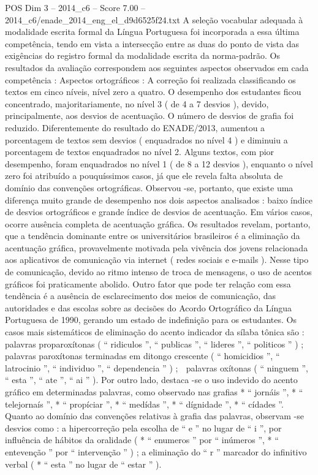 \begin{textsample}{POS Dim 3 – 2014\_c6 – Score 7.00 – 2014\_c6/enade\_2014\_eng\_el\_d9d6525f24.txt}
A seleção vocabular adequada à modalidade escrita formal da Língua Portuguesa foi incorporada a essa última competência, tendo em vista a intersecção entre as duas do ponto de vista das exigências do registro formal da modalidade escrita da norma-padrão.
Os resultados da avaliação correspondem aos seguintes aspectos observados em cada competência : Aspectos ortográficos : A correção foi realizada classificando os textos em cinco níveis, nível zero a quatro.
O desempenho dos estudantes ficou concentrado, majoritariamente, no nível 3 ( de 4 a 7 desvios ), devido, principalmente, aos desvios de acentuação.
O número de desvios de grafia foi reduzido.
Diferentemente do resultado do ENADE/2013, aumentou a porcentagem de textos sem desvios ( enquadrados no nível 4 ) e diminuiu a porcentagem de textos enquadrados no nível 2.
Alguns textos, com pior desempenho, foram enquadrados no nível 1 ( de 8 a 12 desvios ), enquanto o nível zero foi atribuído a pouquíssimos casos, já que ele revela falta absoluta de domínio das convenções ortográficas.
Observou -se, portanto, que existe uma diferença muito grande de desempenho nos dois aspectos analisados : baixo índice de desvios ortográficos e grande índice de desvios de acentuação.
Em vários casos, ocorre ausência completa de acentuação gráfica.
Os resultados revelam, portanto, que a tendência dominante entre os universitários brasileiros é a eliminação da acentuação gráfica, provavelmente motivada pela vivência dos jovens relacionada aos aplicativos de comunicação via internet ( redes sociais e e-mails ).
Nesse tipo de comunicação, devido ao ritmo intenso de troca de mensagens, o uso de acentos gráficos foi praticamente abolido.
Outro fator que pode ter relação com essa tendência é a ausência de esclarecimento dos meios de comunicação, das autoridades e das escolas sobre as decisões do Acordo Ortográfico da Língua Portuguesa de 1990, gerando um estado de indefinição para os estudantes.
Os casos mais sistemáticos de eliminação do acento indicador da sílaba tônica são :  palavras proparoxítonas ( “ ridiculos ”, “ publicas ”, “ lideres ”, “ politicos ” ) ;  palavras paroxítonas terminadas em ditongo crescente ( “ homicidios ”, “ latrocinio ”, “ individuo ”, “ dependencia ” ) ;  palavras oxítonas ( “ ninguem ”, “ esta ”, “ ate ”, “ ai ” ).
Por outro lado, destaca -se o uso indevido do acento gráfico em determinadas palavras, como observado nas grafias * “ jornáis ”, * “ telejornaís ”, * “ propíciar ”, * “ medídas ”, * “ dígnidade ”, * “ cídades ”.
Quanto ao domínio das convenções relativas à grafia das palavras, observam -se desvios como : a hipercorreção pela escolha de “ e ” no lugar de “ i ”, por influência de hábitos da oralidade ( * “ enumeros ” por “ inúmeros ”, * “ entevenção ” por “ intervenção ” ) ; a eliminação do “ r ” marcador do infinitivo verbal ( * “ esta ” no lugar de “ estar ” ).

\end{textsample}
